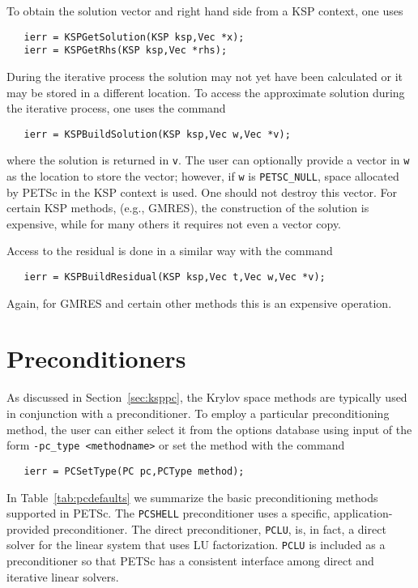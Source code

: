 To obtain the solution vector and right hand side from a KSP 
context, one uses  
\begin{verbatim}
   ierr = KSPGetSolution(KSP ksp,Vec *x);
   ierr = KSPGetRhs(KSP ksp,Vec *rhs);
\end{verbatim}
During   the iterative process
the solution may not yet have been calculated or it may be stored in 
a different location. To access the approximate solution during the 
iterative process, one uses the command 
\begin{verbatim}
   ierr = KSPBuildSolution(KSP ksp,Vec w,Vec *v);
\end{verbatim}
where the solution is returned in {\tt v}. The user can optionally provide
a vector in {\tt w} as the location to store the vector; however, if 
{\tt w} is {\tt PETSC\_NULL}, space allocated by PETSc in the KSP context is 
used. One should not destroy this vector. For certain KSP methods, 
(e.g., GMRES), the construction of the solution is expensive, while for many 
others it requires not even a vector copy. 

Access to the residual is done in a similar way with the 
command 
\begin{verbatim}
   ierr = KSPBuildResidual(KSP ksp,Vec t,Vec w,Vec *v);
\end{verbatim}
Again, for GMRES and certain other methods this is an expensive 
operation.

\section{Preconditioners} 
\label{sec:pc}

As discussed in Section~\ref{sec:ksppc}, the Krylov space methods are
typically used in conjunction with a preconditioner.
To employ a particular preconditioning method, the user can either select 
it from the options database using input of the form 
{\tt -pc\_type <methodname>} or set the method with the 
command  
\begin{verbatim}
   ierr = PCSetType(PC pc,PCType method);
\end{verbatim}
In Table~\ref{tab:pcdefaults} we summarize the basic
preconditioning methods supported in PETSc. 
   
   
The {\tt PCSHELL} preconditioner uses a specific,
application-provided preconditioner.  The direct preconditioner, {\tt PCLU},
is, in fact, a direct solver for the linear system that uses LU
factorization. {\tt PCLU} is included as a preconditioner so that PETSc has a
consistent interface among direct and iterative linear solvers.

